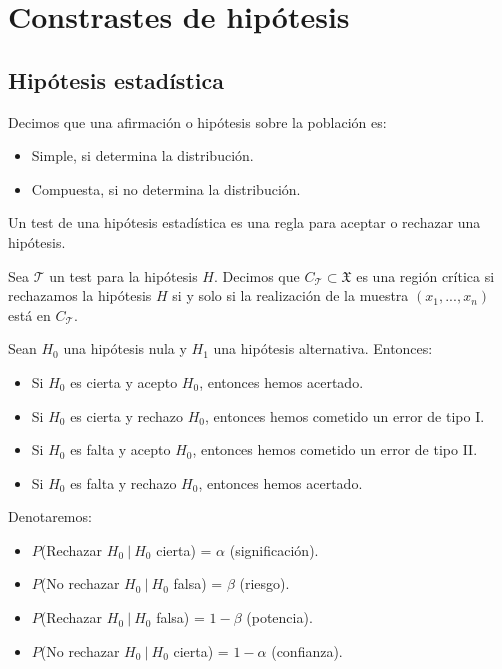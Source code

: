 \chapter{Constrastes de hipótesis}

\section{Hipótesis estadística}

\begin{defi}
Decimos que una afirmación o hipótesis sobre la población es:
\begin{itemize}
    \item Simple, si determina la distribución.
    \item Compuesta, si no determina la distribución.
\end{itemize}
\end{defi}

\begin{defi}
Un test de una hipótesis estadística es una regla para aceptar o rechazar una hipótesis.
\end{defi}

\begin{defi}
Sea $\mathcal{T}$ un test para la hipótesis $H$. Decimos que $C_{\mathcal{T}} \subset \mathfrak{X}$ es una región crítica si rechazamos la hipótesis $H$ si y solo si la realización de la muestra $(x_1,...,x_n)$ está en $C_{\mathcal{T}}$.
\end{defi}

\begin{obs}
Sean $H_0$ una hipótesis nula y $H_1$ una hipótesis alternativa. Entonces:
\begin{itemize}
    \item Si $H_0$ es cierta y acepto $H_0$, entonces hemos acertado.
    \item Si $H_0$ es cierta y rechazo $H_0$, entonces hemos cometido un error de tipo I.
    \item Si $H_0$ es falta y acepto $H_0$, entonces hemos cometido un error de tipo II.
    \item Si $H_0$ es falta y rechazo $H_0$, entonces hemos acertado.
\end{itemize}
Denotaremos:
\begin{itemize}
    \item $P$(Rechazar $H_0 \ | \ H_0$ cierta) = $\alpha$ (significación).
    \item $P$(No rechazar $H_0 \ | \ H_0$ falsa) = $\beta$ (riesgo).
    \item $P$(Rechazar $H_0 \ | \ H_0$ falsa) = $1 -\beta$ (potencia).
    \item $P$(No rechazar $H_0 \ | \ H_0$ cierta) = $1 -\alpha$ (confianza).
\end{itemize}
\end{obs}

